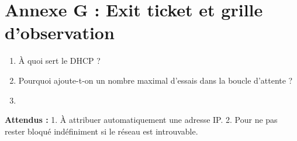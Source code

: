 \documentclass[11pt,a4paper]{article}
\begin{document}
\newpage
\section*{Annexe G : Exit ticket et grille d'observation}

\begin{enumerate}
 \item À quoi sert le DHCP ?\\ \lig
 \item Pourquoi ajoute-t-on un nombre maximal d'essais dans la boucle d'attente ?\\ \lig
 \item \autoeval
\end{enumerate}
\textbf{Attendus :} 1. À attribuer automatiquement une adresse IP. 2. Pour ne pas rester bloqué indéfiniment si le réseau est introuvable.

\bigskip
{}
\end{document}
